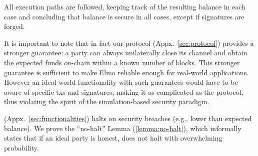 \begin{proofsketch}
  All execution paths are followed, keeping track of the
  resulting balance in each case and concluding that balance is
  secure in all cases, except if signatures are forged.
\end{proofsketch}
    It is important to note that in fact our protocol \pchan (Appx.~\ref{sec:protocol}) provides a stronger guarantee:
  a party can always unilaterally close its channel
  and obtain the expected funds on-chain within a known number of blocks.
  This stronger guarantee is sufficient to make Elmo reliable
  enough for real-world applications. However an ideal world
  functionality with such guarantees would have to be aware of specific
  txs and signatures, making it as complicated
  as the protocol, thus violating the spirit of the simulation-based security
  paradigm.

  \fchan (Appx.~\ref{sec:functionalities}) halts on security breaches (e.g., lower
  than expected balance).
  We prove the ``no-halt'' Lemma (\ref{lemma:no-halt}), which informally states
  that if an ideal party is honest, \fchan does not halt with overwhelming
  probability.


